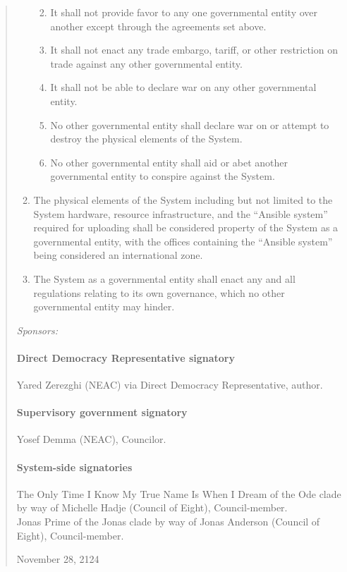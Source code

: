 \begin{quote}
\begin{enumerate}
  \begin{enumerate}
  \def\labelenumii{\alph{enumii}.}
  \tightlist
  \item
    It shall not provide favor to any one governmental entity over another except through the agreements set above.
  \item
    It shall not enact any trade embargo, tariff, or other restriction on trade against any other governmental entity.
  \item
    It shall not be able to declare war on any other governmental entity.
  \item
    No other governmental entity shall declare war on or attempt to destroy the physical elements of the System.
  \item
    No other governmental entity shall aid or abet another governmental entity to conspire against the System.
  \end{enumerate}
\item
  The physical elements of the System including but not limited to the System hardware, resource infrastructure, and the ``Ansible system'' required for uploading shall be considered property of the System as a governmental entity, with the offices containing the ``Ansible system'' being considered an international zone.
\item
  The System as a governmental entity shall enact any and all regulations relating to its own governance, which no other governmental entity may hinder.
\end{enumerate}

\emph{Sponsors:}

\paragraph{Direct Democracy Representative signatory}

Yared Zerezghi (NEAC) via Direct Democracy Representative, author.

\paragraph{Supervisory government signatory}

Yosef Demma (NEAC), Councilor.

\paragraph{System-side signatories}

The Only Time I Know My True Name Is When I Dream of the Ode clade by way of Michelle Hadje (Council of Eight), Council-member.\\
Jonas Prime of the Jonas clade by way of Jonas Anderson (Council of Eight), Council-member.

November 28, 2124
\end{quote}


